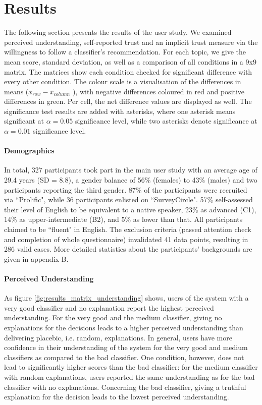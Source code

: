 \section{Results}
The following section presents the results of the user study. We examined perceived understanding, self-reported trust and an implicit trust measure via the willingness to follow a classifier's recommendation. For each topic, we give the mean score, standard deviation, as well as a comparison of all conditions in a 9x9 matrix.\newline
The matrices show each condition checked for significant difference with every other condition. The colour scale is a visualisation of the differences in means ($\bar{x}_{row} - \bar{x}_{column}$ ), with negative differences coloured in red and positive differences in green. Per cell, the net difference values are displayed as well. The significance test results are added with asterisks, where one asterisk means significant at $\alpha=0.05$ significance level, while two asterisks denote significance at $\alpha=0.01$ significance level.\newline 

\paragraph{Demographics}
In total, 327 participants took part in the main user study with an average age of 29.4 years (SD = 8.8), a gender balance of 56\% (females) to 43\% (males) and two participants reporting the third gender. 87\% of the participants were recruited via ``Prolific", while 36 participants enlisted on ``SurveyCircle". 57\% self-assessed their level of English to be equivalent to a native speaker, 23\% as advanced (C1), 14\% as upper-intermediate (B2), and 5\% as lower than that. All participants claimed to be ``fluent" in English. The exclusion criteria (passed attention check and completion of whole questionnaire) invalidated 41 data points, resulting in 286 valid cases. More detailed statistics about the participants' backgrounds are given in appendix B.\newline

\paragraph{Perceived Understanding}
As figure \ref{fig:results_matrix_understanding} shows, users of the system with a very good classifier and no explanation report the highest perceived understanding. For the very good and the medium classifier, giving no explanations for the decisions leads to a higher perceived understanding than delivering placebic, i.e. random, explanations. In general, users have more confidence in their understanding of the system for the very good and medium classifiers as compared to the bad classifier. One condition, however, does not lead to significantly higher scores than the bad classifier: for the medium classifier with random explanations, users reported the same understanding as for the bad classifier with no explanations. Concerning the bad classifier, giving a truthful explanation for the decision leads to the lowest perceived understanding.

